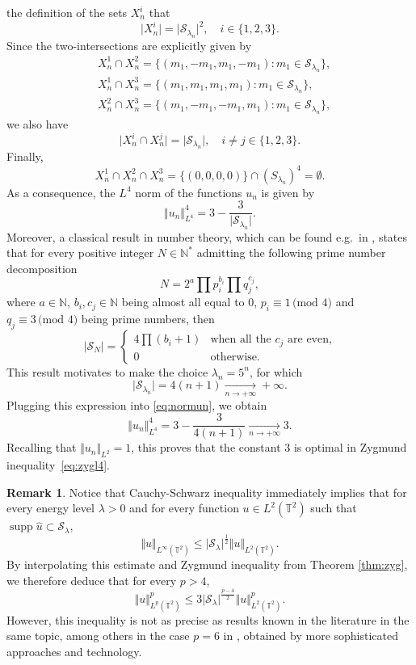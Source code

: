 \documentclass[a4paper,11pt]{amsart}
\numberwithin{equation}{section}
\theoremstyle{definition}
\newtheorem{rk}[thm]{Remark}
\DeclareMathOperator{\supp}{supp}
\begin{document}
the definition of the sets $X^i_n$ that
\[
    \vert X^i_n\vert = \vert\mathcal S_{\lambda_n}\vert^2,\quad i\in\{1,2,3\}.
\]
Since the two-intersections are explicitly given by
\begin{align*}
    & X^1_n\cap X^2_n = \big\{(m_1,-m_1,m_1,-m_1) : m_1\in\mathcal S_{\lambda_n}\big\}, \\[5pt]
    & X^1_n\cap X^3_n = \big\{(m_1,m_1,m_1,m_1) : m_1\in\mathcal S_{\lambda_n}\big\}, \\[5pt]
    & X^2_n\cap X^3_n = \big\{(m_1,-m_1,-m_1,m_1) : m_1\in\mathcal S_{\lambda_n}\big\},
\end{align*}
we also have
\[
    \vert X^i_n\cap X^j_n\vert = \vert\mathcal S_{\lambda_n}\vert,\quad i\ne j\in\{1,2,3\}.
\]
Finally,
\[
    X^1_n\cap X^2_n\cap X^3_n = \big\{(0,0,0,0)\big\} \cap  (S_{\lambda_n})^4 = \emptyset.
\]
As a consequence, the $L^4$ norm of the functions $u_n$ is given by
\begin{equation}\label{eq:normun}
    \Vert u_n\Vert^4_{L^4} = 3 - \frac{3}{\vert\mathcal S_{\lambda_n}\vert}.
\end{equation}
Moreover, a classical result in number theory, which can be found e.g.~in \cite[Section 16.10]{HW}, states that for every positive integer $N\in\mathbb N^*$ admitting the following prime number decomposition
\[
    N = 2^a\prod p_i^{b_i}\prod q_j^{c_j},
\]
where $a\in\mathbb N$, $b_i, c_j\in\mathbb N$ being almost all equal to $0$, $p_i\equiv 1\, \text{(mod $4$)}$ and $q_j\equiv 3\, \text{(mod $4$)}$ being prime numbers, then
\[
    \vert\mathcal S_{N}\vert = \begin{cases}
        4\prod(b_i+1) & \text{when all the $c_j$ are even,} \\[5pt]
        0 & \text{otherwise}.
    \end{cases}
\]
This result motivates to make the choice $\lambda_n = 5^n$, for which
\[
    \vert\mathcal S_{\lambda_n}\vert = 4(n+1) \underset{n\rightarrow+\infty}{\longrightarrow}+\infty.
\]
Plugging this expression into \eqref{eq:normun}, we obtain
\[
    \Vert u_n\Vert^4_{L^4} = 3 - \frac{3}{4(n+1)} \underset{n\rightarrow+\infty}{\longrightarrow} 3.
\]
Recalling that $\Vert u_n\Vert_{L^2} = 1$, this proves that the constant $3$ is optimal in Zygmund inequality~\eqref{eq:zygl4}.

\begin{rk} Notice that Cauchy-Schwarz inequality immediately implies that for every energy level $\lambda>0$ and for every function $u\in L^2(\mathbb T^2)$ such that $\supp\widehat{u}\subset\mathcal S_{\lambda}$,
\[
    \Vert u\Vert_{L^{\infty}(\mathbb T^2)}\le \vert\mathcal S_{\lambda}\vert^{\frac{1}{2}}\Vert u\Vert_{L^2(\mathbb T^2)}.
\]
By interpolating this estimate and Zygmund inequality from Theorem \ref{thm:zyg}, we therefore deduce that for every $p>4$,
\[
    \Vert u\Vert^p_{L^p(\mathbb T^2)}\le 3\vert\mathcal S_{\lambda}\vert^{\frac{p-4}{2}}\Vert u\Vert^p_{L^2(\mathbb T^2)}.
\]
However, this inequality is not as precise as results known in the literature in the same topic, among others in the case $p=6$ in \cite{BB, KKW}, obtained by more sophisticated approaches and technology.
\end{rk}
\end{document}
